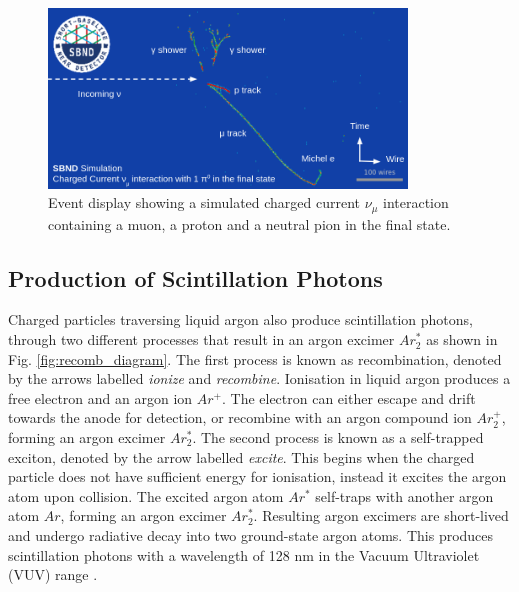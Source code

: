 \begin{figure}[ht!] 
\centering    
\includegraphics[width=0.85\textwidth]{event_display}
\caption[Event Display of a Neutrino Interaction]{
Event display showing a simulated charged current $\nu_{\mu}$ interaction containing a muon, a proton and a neutral pion in the final state.
}
\label{fig:track_shower}
\end{figure}

\subsection{Production of Scintillation Photons}

\label{sec:scintillation}

Charged particles traversing liquid argon also produce scintillation photons, through two different processes that result in an argon excimer $Ar_{2}^{*}$ as shown in Fig. \ref{fig:recomb_diagram}.  
The first process is known as recombination, denoted by the arrows labelled \textit{ionize} and \textit{recombine}.
Ionisation in liquid argon produces a free electron and an argon ion $Ar^{+}$.
The electron can either escape and drift towards the anode for detection, or recombine with an argon compound ion $Ar_2^{+}$, forming an argon excimer $Ar_{2}^{*}$.
The second process is known as a self-trapped exciton, denoted by the arrow labelled \textit{excite}.
This begins when the charged particle does not have sufficient energy for ionisation, instead it excites the argon atom upon collision.
The excited argon atom $Ar^{*}$ self-traps with another argon atom $Ar$, forming an argon excimer $Ar_{2}^{*}$.
Resulting argon excimers are short-lived and undergo radiative decay into two ground-state argon atoms.
This produces scintillation photons with a wavelength of 128 nm in the Vacuum Ultraviolet (VUV) range \cite{Lariat}.

